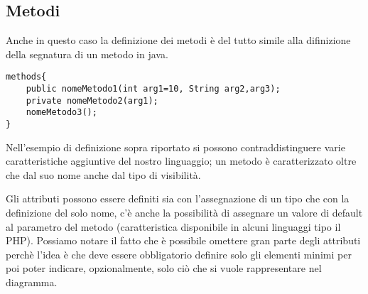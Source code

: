 \subsection{Metodi}

Anche in questo caso la definizione dei metodi è del tutto simile alla
difinizione della segnatura di un metodo in java.

\begin{lstlisting}[caption={Dichiarazione di classe}, style={model}]
methods{
	public nomeMetodo1(int arg1=10, String arg2,arg3);
	private nomeMetodo2(arg1);
	nomeMetodo3();
}
\end{lstlisting}

Nell'esempio di definizione sopra riportato si possono contraddistinguere varie 
caratteristiche aggiuntive del nostro linguaggio; un metodo è caratterizzato
oltre che dal suo nome anche dal tipo di visibilità.

Gli attributi possono essere definiti sia con l'assegnazione di un tipo che con
la definizione del solo nome, c'è anche la possibilità di assegnare un valore di
default al parametro del metodo (caratteristica disponibile in alcuni linguaggi
tipo il PHP).
Possiamo notare il fatto che è possibile omettere gran parte degli attributi
perchè l'idea è che deve essere obbligatorio definire solo gli elementi minimi
per poi poter indicare, opzionalmente, solo ciò che si vuole rappresentare nel diagramma.
